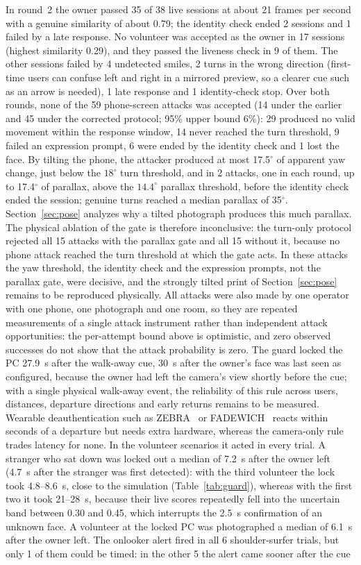 \documentclass{ieeeaccess}
\begin{document}
In round~2 the owner passed 35 of 38 live sessions at about 21 frames per second with a genuine similarity of about 0.79; the identity check ended 2 sessions and 1 failed by a late response. No volunteer was accepted as the owner in 17 sessions (highest similarity 0.29), and they passed the liveness check in 9 of them. The other sessions failed by 4 undetected smiles, 2 turns in the wrong direction (first-time users can confuse left and right in a mirrored preview, so a clearer cue such as an arrow is needed), 1 late response and 1 identity-check stop. Over both rounds, none of the 59 phone-screen attacks was accepted (14 under the earlier and 45 under the corrected protocol; 95\% upper bound 6\%): 29 produced no valid movement within the response window, 14 never reached the turn threshold, 9 failed an expression prompt, 6 were ended by the identity check and 1 lost the face. By tilting the phone, the attacker produced at most 17.5$^\circ$ of apparent yaw change, just below the $18^\circ$ turn threshold, and in 2 attacks, one in each round, up to 17.4$^\circ$ of parallax, above the $14.4^\circ$ parallax threshold, before the identity check ended the session; genuine turns reached a median parallax of 35$^\circ$. Section~\ref{sec:pose} analyzes why a tilted photograph produces this much parallax. The physical ablation of the gate is therefore inconclusive: the turn-only protocol rejected all 15 attacks with the parallax gate and all 15 without it, because no phone attack reached the turn threshold at which the gate acts. In these attacks the yaw threshold, the identity check and the expression prompts, not the parallax gate, were decisive, and the strongly tilted print of Section~\ref{sec:pose} remains to be reproduced physically. All attacks were also made by one operator with one phone, one photograph and one room, so they are repeated measurements of a single attack instrument rather than independent attack opportunities: the per-attempt bound above is optimistic, and zero observed successes do not show that the attack probability is zero. The guard locked the PC 27.9~s after the walk-away cue, 30~s after the owner's face was last seen as configured, because the owner had left the camera's view shortly before the cue; with a single physical walk-away event, the reliability of this rule across users, distances, departure directions and early returns remains to be measured. Wearable deauthentication such as ZEBRA~\cite{mare2014zebra} or FADEWICH~\cite{conti2017fadewich} reacts within seconds of a departure but needs extra hardware, whereas the camera-only rule trades latency for none. In the volunteer scenarios it acted in every trial. A stranger who sat down was locked out a median of 7.2~s after the owner left (4.7~s after the stranger was first detected): with the third volunteer the lock took 4.8--8.6~s, close to the simulation (Table~\ref{tab:guard}), whereas with the first two it took 21--28~s, because their live scores repeatedly fell into the uncertain band between 0.30 and 0.45, which interrupts the 2.5~s confirmation of an unknown face. A volunteer at the locked PC was photographed a median of 6.1~s after the owner left. The onlooker alert fired in all 6 shoulder-surfer trials, but only 1 of them could be timed: in the other 5 the alert came sooner after the cue 
\end{document}
